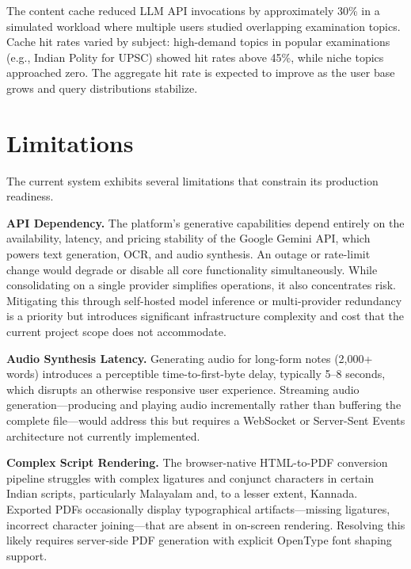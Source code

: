 \documentclass[conference]{IEEEtran}
\begin{document}
The content cache reduced LLM API invocations by approximately 30\% in a simulated workload where multiple users studied overlapping examination topics. Cache hit rates varied by subject: high-demand topics in popular examinations (e.g., Indian Polity for UPSC) showed hit rates above 45\%, while niche topics approached zero. The aggregate hit rate is expected to improve as the user base grows and query distributions stabilize.

\section{Limitations}
\label{sec:limitations}

The current system exhibits several limitations that constrain its production readiness.

\textbf{API Dependency.} The platform's generative capabilities depend entirely on the availability, latency, and pricing stability of the Google Gemini API, which powers text generation, OCR, and audio synthesis. An outage or rate-limit change would degrade or disable all core functionality simultaneously. While consolidating on a single provider simplifies operations, it also concentrates risk. Mitigating this through self-hosted model inference or multi-provider redundancy is a priority but introduces significant infrastructure complexity and cost that the current project scope does not accommodate.

\textbf{Audio Synthesis Latency.} Generating audio for long-form notes (2,000+ words) introduces a perceptible time-to-first-byte delay, typically 5--8 seconds, which disrupts an otherwise responsive user experience. Streaming audio generation---producing and playing audio incrementally rather than buffering the complete file---would address this but requires a WebSocket or Server-Sent Events architecture not currently implemented.

\textbf{Complex Script Rendering.} The browser-native HTML-to-PDF conversion pipeline struggles with complex ligatures and conjunct characters in certain Indian scripts, particularly Malayalam and, to a lesser extent, Kannada. Exported PDFs occasionally display typographical artifacts---missing ligatures, incorrect character joining---that are absent in on-screen rendering. Resolving this likely requires server-side PDF generation with explicit OpenType font shaping support.
\end{document}
